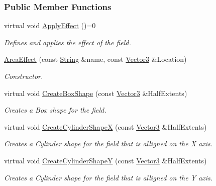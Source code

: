 \subsubsection*{Public Member Functions}
\begin{DoxyCompactItemize}
\item 
virtual void \hyperlink{classphys_1_1AreaEffect_a3b285ecfcf9c9200662d510e48dd222a}{ApplyEffect} ()=0
\begin{DoxyCompactList}\small\item\em Defines and applies the effect of the field. \item\end{DoxyCompactList}\item 
\hyperlink{classphys_1_1AreaEffect_aff3adf2220fecc6954cf7b9512390bf5}{AreaEffect} (const \hyperlink{namespacephys_aa03900411993de7fbfec4789bc1d392e}{String} \&name, const \hyperlink{classphys_1_1Vector3}{Vector3} \&Location)
\begin{DoxyCompactList}\small\item\em Constructor. \item\end{DoxyCompactList}\item 
virtual void \hyperlink{classphys_1_1AreaEffect_a58fe9be01a1c3bdc08ea84cfbf785fdf}{CreateBoxShape} (const \hyperlink{classphys_1_1Vector3}{Vector3} \&HalfExtents)
\begin{DoxyCompactList}\small\item\em Creates a Box shape for the field. \item\end{DoxyCompactList}\item 
virtual void \hyperlink{classphys_1_1AreaEffect_a3b5e2da0598ded89ccdf2dee80441336}{CreateCylinderShapeX} (const \hyperlink{classphys_1_1Vector3}{Vector3} \&HalfExtents)
\begin{DoxyCompactList}\small\item\em Creates a Cylinder shape for the field that is alligned on the X axis. \item\end{DoxyCompactList}\item 
virtual void \hyperlink{classphys_1_1AreaEffect_aa66eaddac1b2c945bf66346097180506}{CreateCylinderShapeY} (const \hyperlink{classphys_1_1Vector3}{Vector3} \&HalfExtents)
\begin{DoxyCompactList}\small\item\em Creates a Cylinder shape for the field that is alligned on the Y axis. \item\end{DoxyCompactList}\item 

\end{DoxyCompactItemize}
